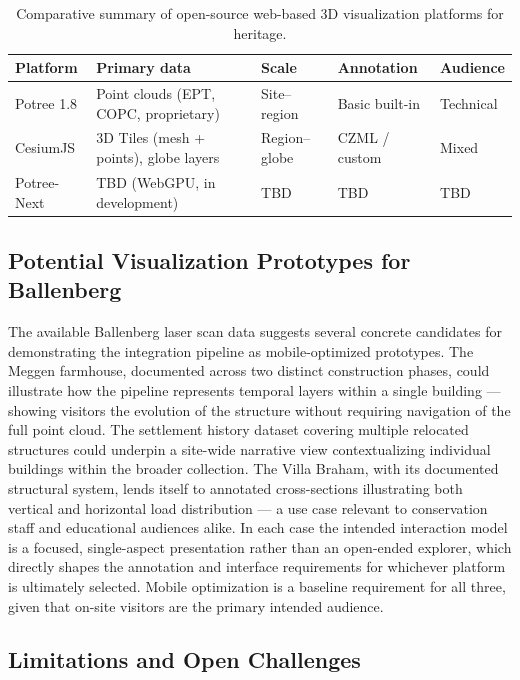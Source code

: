 \documentclass[]{report}
\begin{document}
\begin{table}[h]
\centering
\caption{Comparative summary of open-source web-based 3D visualization platforms for heritage.}
\label{tab:webplatforms}
\begin{tabular}{lllll}
\hline
\textbf{Platform} & \textbf{Primary data} & \textbf{Scale} & \textbf{Annotation} & \textbf{Audience} \\
\hline
Potree 1.8        & Point clouds (EPT, COPC, proprietary) & Site--region  & Basic built-in & Technical \\
CesiumJS          & 3D Tiles (mesh + points), globe layers & Region--globe & CZML / custom & Mixed \\
Potree-Next       & TBD (WebGPU, in development)           & TBD            & TBD            & TBD \\
\hline
\end{tabular}
\end{table}

\subsection{Potential Visualization Prototypes for Ballenberg}

The available Ballenberg laser scan data suggests several concrete candidates for
demonstrating the integration pipeline as mobile-optimized prototypes. The Meggen farmhouse,
documented across two distinct construction phases, could illustrate how the pipeline
represents temporal layers within a single building --- showing visitors the evolution of
the structure without requiring navigation of the full point cloud. The settlement history
dataset covering multiple relocated structures could underpin a site-wide narrative view
contextualizing individual buildings within the broader collection. The Villa Braham, with
its documented structural system, lends itself to annotated cross-sections illustrating
both vertical and horizontal load distribution --- a use case relevant to conservation
staff and educational audiences alike. In each case the intended interaction model is a
focused, single-aspect presentation rather than an open-ended explorer, which directly
shapes the annotation and interface requirements for whichever platform is ultimately
selected. Mobile optimization is a baseline requirement for all three, given that
on-site visitors are the primary intended audience.

\subsection{Limitations and Open Challenges}
\end{document}
